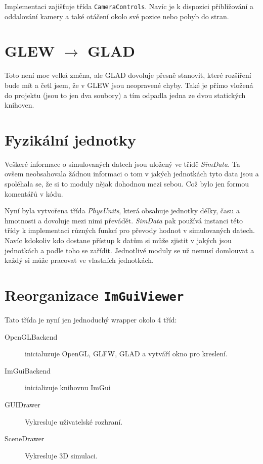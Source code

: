 Implementaci zajišťuje třída \texttt{CameraControls}. Navíc je k dispozici přibližování a oddalování kamery a také otáčení okolo své pozice nebo pohyb do stran.

\section{GLEW $ \rightarrow $ GLAD}

Toto není moc velká změna, ale GLAD dovoluje přesně stanovit, které rozšíření bude mít a četl jsem, že v GLEW jsou neopravené chyby. Také je přímo vložená do projektu (jsou to jen dva soubory) a tím odpadla jedna ze dvou statických knihoven.

\section{Fyzikální jednotky}

Veškeré informace o simulovaných datech jsou uložený ve třídě \textit{SimData}. Ta ovšem neobsahovala žádnou informaci o tom v jakých jednotkách tyto data jsou a spoléhala se, že si to moduly nějak dohodnou mezi sebou. Což bylo jen formou komentářů v kódu.

Nyní byla vytvořena třída \textit{PhysUnits}, která obsahuje jednotky délky, času a hmotnosti a dovoluje mezi nimi převádět. \textit{SimData} pak používá instanci této třídy k implementaci různých funkcí pro převody hodnot v simulovaných datech. Navíc kdokoliv kdo dostane přístup k datům si může zjistit v jakých jsou jednotkách a podle toho se zařídit. Jednotlivé moduly se už nemusí domlouvat a každý si může pracovat ve vlastních jednotkách. 

\section{Reorganizace \texttt{ImGuiViewer}}
Tato třída je nyní jen jednoduchý wrapper okolo 4 tříd:
\begin{description}
	\item[OpenGLBackend] inicialuzuje OpenGL, GLFW, GLAD a vytváří okno pro kreslení.
	\item[ImGuiBackend] inicializuje knihovnu ImGui
	\item[GUIDrawer] Vykresluje uživatelské rozhraní.
	\item[SceneDrawer] Vykresluje 3D simulaci.
\end{description}
